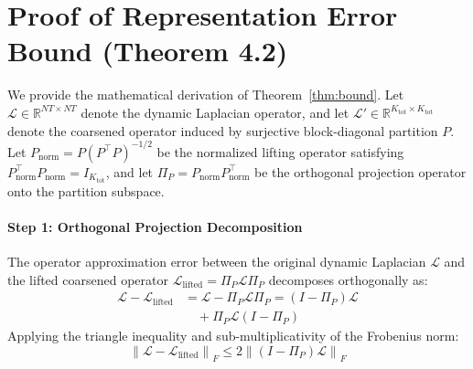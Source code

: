 \documentclass[sigconf]{acmart}
\begin{document}



\appendix

\section{Proof of Representation Error Bound (Theorem 4.2)}
\label{app:proof}
We provide the mathematical derivation of Theorem~\ref{thm:bound}. Let $\mathcal{L} \in \mathbb{R}^{NT \times NT}$ denote the dynamic Laplacian operator, and let $\mathcal{L}' \in \mathbb{R}^{K_{\text{tot}} \times K_{\text{tot}}}$ denote the coarsened operator induced by surjective block-diagonal partition $P$. Let $P_{\text{norm}} = P (P^\top P)^{-1/2}$ be the normalized lifting operator satisfying $P_{\text{norm}}^\top P_{\text{norm}} = I_{K_{\text{tot}}}$, and let $\Pi_P = P_{\text{norm}} P_{\text{norm}}^\top$ be the orthogonal projection operator onto the partition subspace.

\paragraph{Step 1: Orthogonal Projection Decomposition}
The operator approximation error between the original dynamic Laplacian $\mathcal{L}$ and the lifted coarsened operator $\mathcal{L}_{\text{lifted}} = \Pi_P \mathcal{L} \Pi_P$ decomposes orthogonally as:
\begin{equation}
\label{eq:proof_decomp}
\begin{split}
\mathcal{L} - \mathcal{L}_{\text{lifted}} &= \mathcal{L} - \Pi_P \mathcal{L} \Pi_P = (I - \Pi_P) \mathcal{L} \\
&\quad + \Pi_P \mathcal{L} (I - \Pi_P)
\end{split}
\end{equation}
Applying the triangle inequality and sub-multiplicativity of the Frobenius norm:
\begin{equation}
\label{eq:proof_triangle}
\left\| \mathcal{L} - \mathcal{L}_{\text{lifted}} \right\|_F \le 2 \left\| (I - \Pi_P) \mathcal{L} \right\|_F
\end{equation}
\end{document}
